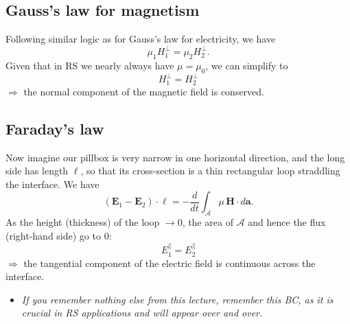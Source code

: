 \documentclass[11pt, oneside]{article}
\begin{document}
\subsection{Gauss's law for magnetism}

Following similar logic as for Gauss's law for electricity, we have
\begin{equation}
	\mu_1 H_1^\perp = \mu_2 H_2^\perp.
\end{equation}
Given that in RS we nearly always have $\mu = \mu_0$, we can simplify to
\begin{equation}
	\boxed{H_1^\perp = H_2^\perp}
\end{equation}
$\Rightarrow$ the normal component of the magnetic field is conserved.

\subsection{Faraday's law}

Now imagine our pillbox is very narrow in one horizontal direction, and the long side has length $\ell$, so that its cross-section is a thin rectangular loop straddling the interface. We have
\begin{equation}
	(\mathbf{E}_1 - \mathbf{E}_2)\cdot\boldsymbol{\ell} = -\frac{d}{dt}\int_{\mathcal{A}} \mu\,\mathbf{H}\cdot d\mathbf{a}.
\end{equation}
As the height (thickness) of the loop $\rightarrow 0$, the area of $\mathcal{A}$ and hence the flux (right-hand side) go to 0:
\begin{equation}
	\boxed{E_1^\parallel = E_2^\parallel}
\end{equation}
$\Rightarrow$ the tangential component of the electric field is continuous across the interface.

\begin{itemize}
	\item[$\bigstar$] \emph{If you remember nothing else from this lecture, remember this BC, as it is crucial in RS applications and will appear over and over.}
\end{itemize}
\end{document}
